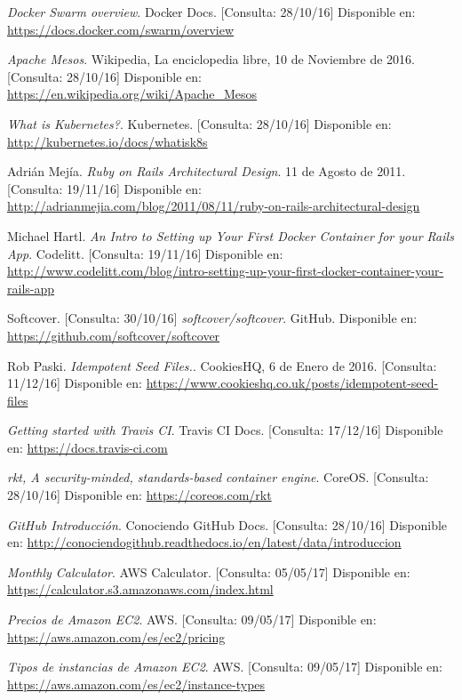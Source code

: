 \begin{thebibliography}{9}
\textit{Docker Swarm overview}. 
Docker Docs. [Consulta: 28/10/16]
Disponible en: \url{https://docs.docker.com/swarm/overview}

\textit{Apache Mesos}. 
Wikipedia, La enciclopedia libre, 10 de Noviembre de 2016. [Consulta: 28/10/16]
Disponible en: \url{https://en.wikipedia.org/wiki/Apache\_Mesos}

\textit{What is Kubernetes?}. 
Kubernetes. [Consulta: 28/10/16]
Disponible en: \url{http://kubernetes.io/docs/whatisk8s}

Adrián Mejía.
\textit{Ruby on Rails Architectural Design}. 
11 de Agosto de 2011. [Consulta: 19/11/16]
Disponible en: \url{http://adrianmejia.com/blog/2011/08/11/ruby-on-rails-architectural-design}

Michael Hartl.
\textit{An Intro to Setting up Your First Docker Container for your Rails App}. 
Codelitt. [Consulta: 19/11/16]
Disponible en: \url{http://www.codelitt.com/blog/intro-setting-up-your-first-docker-container-your-rails-app}

Softcover. [Consulta: 30/10/16]
\textit{softcover/softcover}. GitHub.
Disponible en: \url{https://github.com/softcover/softcover}

Rob Paski.
\textit{Idempotent Seed Files.}. 
CookiesHQ, 6 de Enero de 2016. [Consulta: 11/12/16]
Disponible en: \url{https://www.cookieshq.co.uk/posts/idempotent-seed-files}

\textit{Getting started with Travis CI}. 
Travis CI Docs. [Consulta: 17/12/16]
Disponible en: \url{https://docs.travis-ci.com}

\textit{rkt, A security-minded, standards-based container engine}. 
CoreOS. [Consulta: 28/10/16]
Disponible en: \url{https://coreos.com/rkt}

\textit{GitHub Introducción}. 
Conociendo GitHub Docs. [Consulta: 28/10/16]
Disponible en: \url{http://conociendogithub.readthedocs.io/en/latest/data/introduccion}

\textit{Monthly Calculator}. 
AWS Calculator. [Consulta: 05/05/17]
Disponible en: \url{https://calculator.s3.amazonaws.com/index.html}

\textit{Precios de Amazon EC2}. 
AWS. [Consulta: 09/05/17]
Disponible en: \url{https://aws.amazon.com/es/ec2/pricing}

\textit{Tipos de instancias de Amazon EC2}. 
AWS. [Consulta: 09/05/17]
Disponible en: \url{https://aws.amazon.com/es/ec2/instance-types}

\end{thebibliography}


